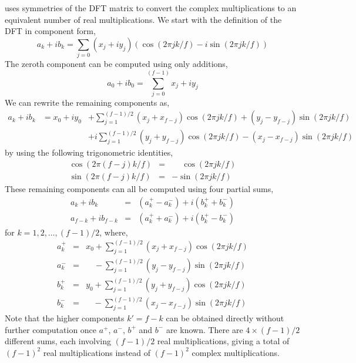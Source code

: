 \documentclass[fleqn,12pt]{article}
\begin{document}
uses symmetries of the DFT matrix to convert the complex
multiplications to an equivalent number of real multiplications. We
start with the definition of the DFT in component form,
%
\begin{equation}
a_k + i b_k = \sum_{j=0} (x_j+iy_j)(\cos(2\pi jk/f) - i\sin(2\pi jk/f))
\end{equation}
%
The zeroth component can be computed using only additions,
%
\begin{equation}
a_0 + i b_0 = \sum_{j=0}^{(f-1)} x_j + i y_j
\end{equation}
%
We can rewrite the remaining components as,
%
\begin{eqnarray}
a_k + i b_k & =   x_0 + i y_0 & + 
  \sum_{j=1}^{(f-1)/2} (x_j + x_{f-j}) \cos(2\pi jk/f)
 + (y_j - y_{f-j}) \sin(2\pi jk/f) \\
& & + i\sum_{j=1}^{(f-1)/2} (y_j + y_{f-j}) \cos(2\pi jk/f) 
 - (x_j - x_{f-j}) \sin(2\pi jk/f)
\end{eqnarray}
%
by using the following trigonometric identities,
%
\begin{eqnarray}
 \cos(2\pi(f-j)k/f) &=& \phantom{-}\cos(2\pi jk/f) \\
 \sin(2\pi(f-j)k/f) &=&  -\sin(2\pi jk/f)
\end{eqnarray}
%
These remaining components can all be computed using four partial
sums,
%
\begin{eqnarray}
a_k + i b_k & = & (a^+_k - a^-_k) + i (b^+_k + b^-_k) \\
a_{f-k} + i b_{f-k} & = & (a^+_k + a^-_k) + i (b^+_k - b^-_k)
\end{eqnarray}
%
for $k = 1, 2, \dots, (f-1)/2$, where,
%
\begin{eqnarray}
a^+_k &=& x_0 + \sum_{j=1}^{(f-1)/2} (x_j + x_{f-j}) \cos(2\pi jk/f) \\
a^-_k &=& \phantom{x_0} - \sum_{j=1}^{(f-1)/2} (y_j - y_{f-j}) \sin(2\pi jk/f) \\
b^+_k &=& y_0 + \sum_{j=1}^{(f-1)/2} (y_j + y_{f-j}) \cos(2\pi jk/f) \\
b^-_k &=& \phantom{y_0} - \sum_{j=1}^{(f-1)/2} (x_j - x_{f-j}) \sin(2\pi jk/f)
\end{eqnarray}
%
Note that the higher components $k'=f-k$ can be obtained directly
without further computation once $a^+$, $a^-$, $b^+$ and $b^-$ are
known. There are $4 \times (f-1)/2$ different sums, each involving
$(f-1)/2$ real multiplications, giving a total of $(f-1)^2$ real
multiplications instead of $(f-1)^2$ complex multiplications.
\end{document}
